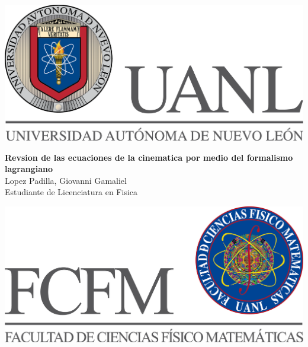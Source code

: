 \documentclass{article}
\begin{document}
\begin{center}
  \begin{minipage}{.19\linewidth}
    \includegraphics[width=1.1\linewidth]{images/uanl.png}
  \end{minipage}
  \begin{minipage}{.6\linewidth}
    \begin{center}
      \Large \textbf{Revsion de las ecuaciones de la cinematica por medio del formalismo lagrangiano
       }\\
   Lopez Padilla, Giovanni Gamaliel\\
   Estudiante de Licenciatura en Fisica
    \end{center}
  \end{minipage}
  \begin{minipage}{0.19\linewidth}
    \includegraphics[width=1.1\linewidth]{images/fcfm.png}
  \end{minipage}
\end{center}
\vspace{.1cm}
\changefontsizes{14pt}
\end{document}
